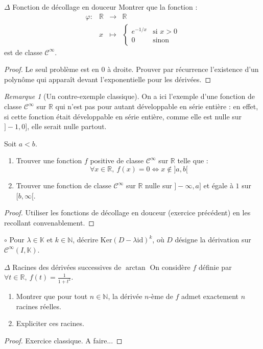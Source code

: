 \documentclass[french,a4paper]{article}
\newcommand{\N}{\mathbb{N}}
\newcommand{\R}{\mathbb{R}}
\newcommand{\K}{\mathbb{K}}
\renewcommand{\ker}{\text{Ker}}
\theoremstyle{plain}
\theoremstyle{definition}
\theoremstyle{remark}
\newtheorem*{rmq}{Remarque}
\begin{document}
\begin{ex}[Moulin.FV.14]{$\Delta$ Fonction de décollage en douceur}
	Montrer que la fonction : $$\begin{array}{lrcl}
		\varphi:&\R&\longrightarrow&\R \\
		&x&\longmapsto&\displaystyle\begin{cases}
			e^{-1/x}&\text{si }x>0 \\
			0&\text{sinon}
		\end{cases}
	\end{array}$$ est de classe $\mathcal{C}^\infty$.
\end{ex}
\begin{proof}
	Le seul problème est en $0$ à droite. Prouver par récurrence l'existence d'un polynôme qui apparaît devant l'exponentielle pour les dérivées.
\end{proof}
\begin{rmq}[Un contre-exemple classique]
	On a ici l'exemple d'une fonction de classe $\mathcal{C}^\infty$ sur $\R$ qui n'est pas pour autant développable en série entière : en effet, si cette fonction était développable en série entière, comme elle est nulle sur $]-1,0]$, elle serait nulle partout.
\end{rmq}

\begin{ex}[Moulin.FV.15]{}
	Soit $a<b$.
	\begin{enumerate}
		\item Trouver une fonction $f$ positive de classe $\mathcal{C}^\infty$ sur $\R$ telle que : $$\forall x\in\R,\ f(x)=0\iff x\notin]a,b[$$
		\item Trouver une fonction de classe $\mathcal{C}^\infty$ sur $\R$ nulle sur $]-\infty,a]$ et égale à $1$ sur $[b,\infty[$.
	\end{enumerate}
\end{ex}
\begin{proof}
	Utiliser les fonctions de décollage en douceur (exercice précédent) en les recollant convenablement.
\end{proof}

\begin{ex}[Moulin.FV.16]{$\circ$}
	Pour $\lambda\in\K$ et $k\in\N$, décrire $\ker(D-\lambda\text{id})^k$, où $D$ désigne la dérivation sur $\mathcal{C}^\infty(I,\K)$.
\end{ex}

\begin{ex}[Moulin.FV.17]{$\Delta$ Racines des dérivées successives de $\arctan$}
	On considère $f$ définie par $\forall t\in\R,\ f(t)=\displaystyle\frac{1}{1+t^2}$. 
	\begin{enumerate}
		\item Montrer que pour tout $n\in\N$, la dérivée $n$-ème de $f$ admet exactement $n$ racines réelles.
		\item Expliciter ces racines.
	\end{enumerate} 
\end{ex}
\begin{proof}
	Exercice classique. A faire...
\end{proof}
\end{document}
